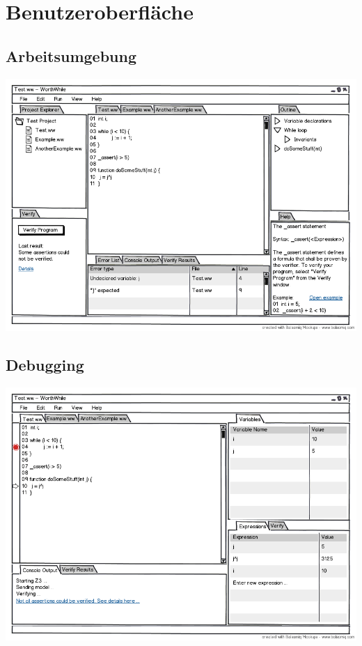 \section{Benutzeroberfläche}%

\subsection{Arbeitsumgebung}%

\includegraphics[width=\textwidth]{mockup/mockup.png}

\subsection{Debugging}%

\includegraphics[width=\textwidth]{mockup/debug.png}
